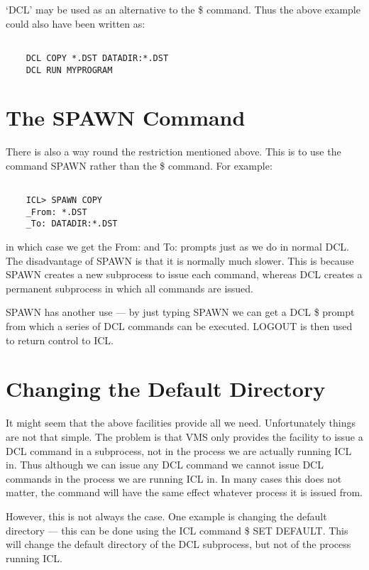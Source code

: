 \documentclass[twoside,11pt]{report}
\newcommand{\xlabel}[1]{}
\begin{document}
`DCL' may be used as an alternative to the \$ command. Thus the
above example could also have been written as:

\begin{verbatim}

    DCL COPY *.DST DATADIR:*.DST
    DCL RUN MYPROGRAM

\end{verbatim}

\section{\xlabel{the_spawn_command}The SPAWN Command}
There is also a way round the restriction mentioned above. This is to
use the command SPAWN rather than the \$ command. For example:

\begin{verbatim}

    ICL> SPAWN COPY
    _From: *.DST
    _To: DATADIR:*.DST

\end{verbatim}
in which case we get the From: and To: prompts just as we do in normal DCL.
The disadvantage of SPAWN is that it is normally much slower. This is because
SPAWN creates a new subprocess to issue each command, whereas DCL creates
a permanent subprocess in which all commands are issued.

SPAWN has another use --- by just typing SPAWN we can get a DCL \$ prompt
from which a series of DCL commands can be executed. LOGOUT is then used
to return control to ICL.

\section{\xlabel{changing_the_default_directory}Changing the Default Directory}
It might seem that the above facilities provide all we need. Unfortunately
things are not that simple. The problem is that VMS only provides the facility
to issue a DCL command in a subprocess, not in the process we are actually
running ICL in. Thus although we can issue any DCL command we cannot issue
DCL commands in the process we are running ICL in. In many cases this does not
matter, the command will have the same effect whatever process it is issued
from.

However, this is not always the case. One example is changing the default
directory --- this can be done using the ICL command \$ SET DEFAULT. This
will change the default directory of the DCL subprocess, but not of the
process running ICL.
\end{document}
